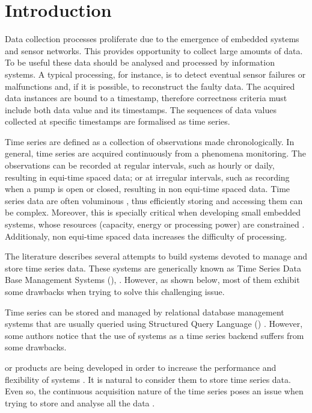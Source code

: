 \section{Introduction}

Data collection processes proliferate due to the emergence of embedded
systems and sensor networks.  This provides opportunity to collect
large amounts of data. To be useful these data should be analysed and
processed by information systems. A typical processing, for instance,
is to detect eventual sensor failures or malfunctions and, if it is
possible, to reconstruct the faulty data. The acquired data instances
are bound to a timestamp, therefore correctness criteria must include
both data value and its timestamps. The sequences of data values
collected at specific timestamps are formalised as time series.

Time series are defined as a collection of observations made
chronologically.  In general, time series are acquired continuously
from a phenomena monitoring. The observations can be recorded at
regular intervals, such as hourly or daily, resulting in equi-time
spaced data; or at irregular intervals, such as recording when a pump
is open or closed, resulting in non equi-time spaced data. Time series
data are often voluminous \cite{fu11,keogh08:isax}, thus efficiently
storing and accessing them can be complex. Moreover, this is specially
critical when developing small embedded systems, whose resources
(capacity, energy or processing power) are constrained
\cite{yaogehrke02}.  Additionaly, non equi-time spaced data increases
the difficulty of processing.

The literature describes several attempts to build systems devoted to
manage and store time series data. These systems are generically known
as Time Series Data Base Management Systems (),
\cite{dreyer94,last01}. However, as shown below, most of them exhibit
some drawbacks when trying to solve this challenging issue.

Time series can be stored and managed by relational database
management systems that are usually queried using Structured Query
Language () .
%
However, some authors
\cite{dreyer94,schmidt95,stonebraker09:scidb,zhang11} notice that the
use of  systems as a time series backend suffers from some
drawbacks.

 or  products are being developed in order to
increase the performance and flexibility of  systems
\cite{atzeni13:relational_model_dead,stonebraker10,stonebraker09:scidb,zhang11}.
%
It is natural to consider them to store time series data. Even so, the
continuous acquisition nature of the time series poses an issue when
trying to store and analyse all the data \cite{keogh97}.

